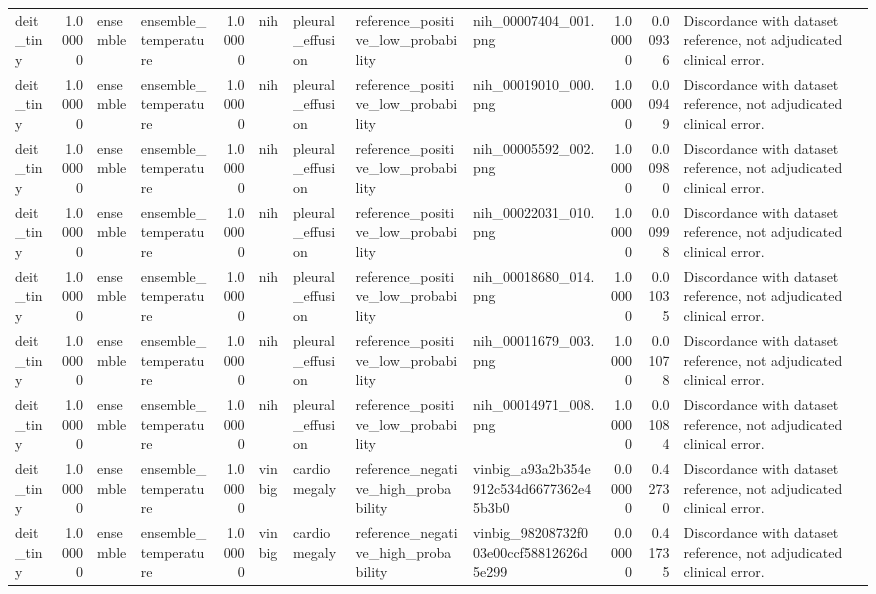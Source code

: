 \begin{tabular}{lrllrllllrrl}
deit\_tiny & 1.00000 & ensemble & ensemble\_temperature & 1.00000 & nih & pleural\_effusion & reference\_positive\_low\_probability & nih\_00007404\_001.png & 1.00000 & 0.00936 & Discordance with dataset reference, not adjudicated clinical error. \\
deit\_tiny & 1.00000 & ensemble & ensemble\_temperature & 1.00000 & nih & pleural\_effusion & reference\_positive\_low\_probability & nih\_00019010\_000.png & 1.00000 & 0.00949 & Discordance with dataset reference, not adjudicated clinical error. \\
deit\_tiny & 1.00000 & ensemble & ensemble\_temperature & 1.00000 & nih & pleural\_effusion & reference\_positive\_low\_probability & nih\_00005592\_002.png & 1.00000 & 0.00980 & Discordance with dataset reference, not adjudicated clinical error. \\
deit\_tiny & 1.00000 & ensemble & ensemble\_temperature & 1.00000 & nih & pleural\_effusion & reference\_positive\_low\_probability & nih\_00022031\_010.png & 1.00000 & 0.00998 & Discordance with dataset reference, not adjudicated clinical error. \\
deit\_tiny & 1.00000 & ensemble & ensemble\_temperature & 1.00000 & nih & pleural\_effusion & reference\_positive\_low\_probability & nih\_00018680\_014.png & 1.00000 & 0.01035 & Discordance with dataset reference, not adjudicated clinical error. \\
deit\_tiny & 1.00000 & ensemble & ensemble\_temperature & 1.00000 & nih & pleural\_effusion & reference\_positive\_low\_probability & nih\_00011679\_003.png & 1.00000 & 0.01078 & Discordance with dataset reference, not adjudicated clinical error. \\
deit\_tiny & 1.00000 & ensemble & ensemble\_temperature & 1.00000 & nih & pleural\_effusion & reference\_positive\_low\_probability & nih\_00014971\_008.png & 1.00000 & 0.01084 & Discordance with dataset reference, not adjudicated clinical error. \\
deit\_tiny & 1.00000 & ensemble & ensemble\_temperature & 1.00000 & vinbig & cardiomegaly & reference\_negative\_high\_probability & vinbig\_a93a2b354e912c534d6677362e45b3b0 & 0.00000 & 0.42730 & Discordance with dataset reference, not adjudicated clinical error. \\
deit\_tiny & 1.00000 & ensemble & ensemble\_temperature & 1.00000 & vinbig & cardiomegaly & reference\_negative\_high\_probability & vinbig\_98208732f003e00ccf58812626d5e299 & 0.00000 & 0.41735 & Discordance with dataset reference, not adjudicated clinical error. \\

\end{tabular}
